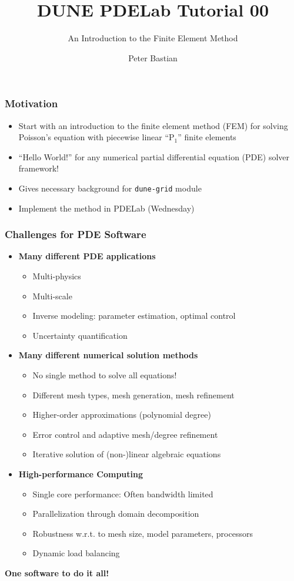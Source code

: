 \documentclass[aspectratio=169,11pt]{beamer}
\title{DUNE PDELab Tutorial 00}
\subtitle{An Introduction to the Finite Element Method}
\author{Peter Bastian}
\institute[]
{
 IWR\\
 Heidelberg University
}
\theoremstyle{definition}
\begin{document}


\begin{frame}
\frametitle{Motivation}
\begin{itemize}
\item Start with an introduction to the finite element method (FEM) for solving Poisson's equation
with piecewise linear ``P$_1$'' finite elements
\item ``Hello World!'' for any numerical partial differential equation (PDE) solver framework!
\item Gives necessary background for \lstinline{dune-grid} module
\item Implement the method in PDELab (Wednesday)
\end{itemize}
\end{frame}

\begin{frame}
\frametitle{Challenges for PDE Software}
\begin{itemize}
\item \textbf{Many different PDE applications}
\begin{itemize}
\item Multi-physics
\item Multi-scale
\item Inverse modeling: parameter estimation, optimal control
\item Uncertainty quantification
\end{itemize}
\item \textbf{Many different numerical solution methods}
\begin{itemize}
\item No single method to solve all equations!
\item Different mesh types,  mesh generation, mesh refinement
\item Higher-order approximations (polynomial degree)
\item Error control and adaptive mesh/degree refinement
\item Iterative solution of (non-)linear algebraic equations
\end{itemize}
\item \textbf{High-performance Computing}
\begin{itemize}
\item Single core performance: Often bandwidth limited
\item Parallelization through domain decomposition
\item Robustness w.r.t. to mesh size, model parameters,  processors
\item Dynamic load balancing
\end{itemize}
\end{itemize}
\rightarrownice \textbf{One software to do it all!}
\end{frame}
\end{document}
